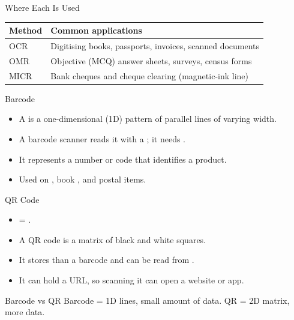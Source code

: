 \documentclass[aspectratio=169]{beamer}
\begin{document}
\begin{frame}{Where Each Is Used}
  \begin{center}
    \begin{tabular}{p{}p{}}
      \toprule
      \textbf{Method} & \textbf{Common applications} \\
      \midrule
      OCR & Digitising books, passports, invoices, scanned documents \\
      OMR & Objective (MCQ) answer sheets, surveys, census forms \\
      MICR & Bank cheques and cheque clearing (magnetic-ink line) \\
      \bottomrule
    \end{tabular}
  \end{center}
  \vspace{0.25cm}
\end{frame}

\begin{frame}{Barcode}
  \begin{itemize}
    \item A  is a one-dimensional (1D) pattern of parallel lines
      of varying width.
    \item A barcode scanner reads it with a ; it needs
      .
    \item It represents a number or code that identifies a product.
    \item Used on , book , and postal items.
  \end{itemize}
\end{frame}

\begin{frame}{QR Code}
  \begin{itemize}
    \item {} = .
    \item A QR code is a  matrix of black and
      white squares.
    \item It stores  than a barcode and can be read from
      .
    \item It can hold a URL, so scanning it can open a website or app.
  \end{itemize}
  \begin{block}{Barcode vs QR}
    Barcode = 1D lines, small amount of data. QR = 2D matrix, more data.
  \end{block}
\end{frame}
\end{document}
